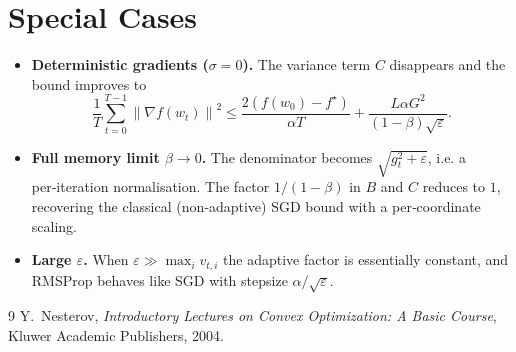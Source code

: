 \documentclass{article}
\newcommand{\norm}[1]{\left\lVert#1\right\rVert}
\begin{document}
\section*{Special Cases}
\begin{itemize}[leftmargin=*]
\item \textbf{Deterministic gradients ($\sigma=0$).} The variance term $C$ disappears and the bound improves to
\[
\frac{1}{T}\sum_{t=0}^{T-1}\norm{\nabla f(w_{t})}^{2}
\le \frac{2(f(w_{0})-f^{\star})}{\alpha T}
   +\frac{L\alpha G^{2}}{(1-\beta)\sqrt{\varepsilon}}.
\]
\item \textbf{Full memory limit $\beta\to0$.} The denominator becomes $\sqrt{g_{t}^{2}+\varepsilon}$, i.e. a per‑iteration normalisation. The factor $1/(1-\beta)$ in $B$ and $C$ reduces to $1$, recovering the classical (non‑adaptive) SGD bound with a per‑coordinate scaling.
\item \textbf{Large $\varepsilon$.} When $\varepsilon\gg\max_{i}v_{t,i}$ the adaptive factor is essentially constant, and RMSProp behaves like SGD with stepsize $\alpha/\sqrt{\varepsilon}$.
\end{itemize}

\begin{thebibliography}{9}
Y.~Nesterov, \emph{Introductory Lectures on Convex Optimization: A Basic Course}, Kluwer Academic Publishers, 2004.
\end{thebibliography}
\end{document}

